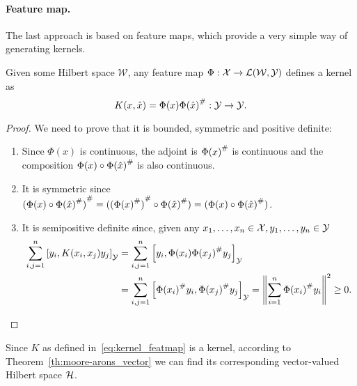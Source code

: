 \paragraph*{Feature map.}
The last approach is based on feature maps, which provide a very simple way of generating kernels.
\begin{lemma}
    Given some Hilbert space $\mathcal{W}$, any feature map $\Phi: \mathcal{X} \to \mathcal{L}(\mathcal{W}, \mathcal{Y})$ defines a kernel as
\begin{equation}
    \label{eq:kernel_featmap}
    K(x, \hat{x}) = \Phi(x) \adj{\Phi(\hat{x})}: \Yspace \to \Yspace .
\end{equation}
\end{lemma}
\begin{proof} We need to prove that it is bounded, symmetric and positive definite:
    \begin{enumerate}
        \item Since $\Phi(x)$ is continuous, the adjoint is ${\Phi(x)}^{\#}$ is continuous and the composition $\Phi(x) \circ {\Phi(\hat{x})}^{\#}$ is also continuous.
        \item It is symmetric since  ${(\Phi(x) \circ {\Phi(\hat{x})}^{\#})}^{\#} = ({({\Phi(x)}^{\#})}^{\#} \circ {\Phi(\hat{x})}^{\#}) = (\Phi(x) \circ {\Phi(\hat{x})}^{\#}) $.
        \item It is semipositive definite since, given any $x_1, \ldots, x_n \in \mathcal{X},  y_1, \ldots, y_n \in \mathcal{Y}$
        \begin{equation}
            \nonumber
            \begin{aligned}
                \sum_{i, j =1}^n \left[ y_i, K(x_i, x_j) y_j \right]_\mathcal{Y} &= \sum_{i, j =1}^n \left[ y_i,  \Phi(x_i) {\Phi(x_j)}^{\#} y_j \right]_\mathcal{Y} \\
                & = \sum_{i, j =1}^n \left[ {\Phi(x_i)}^{\#} y_i,  {\Phi(x_j)}^{\#} y_j \right]_\mathcal{Y} = \left\lVert\sum_{i=1}^n {\Phi(x_i)}^{\#} y_i\right\rVert^2 \geq 0 .
            \end{aligned}
        \end{equation}
    \end{enumerate}
\end{proof}
Since $K$ as defined in~\eqref{eq:kernel_featmap} is a kernel, according to Theorem~\ref{th:moore-arons_vector} we can find its corresponding vector-valued Hilbert space $\mathcal{H}$.

